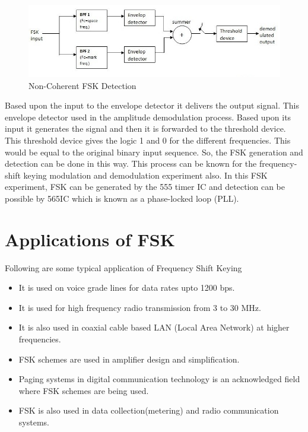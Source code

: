 \documentclass{report}
\begin{document}
	\newpage
	
		\begin{figure}[H]
		\centering
		\includegraphics[width=\linewidth]{images/non_coherent_fsk.jpg}
		\caption{Non-Coherent FSK Detection}
		\label{fig:}
	\end{figure}
	
	Based upon the input to the envelope detector it delivers the output signal. This envelope detector used in the amplitude demodulation process. Based upon its input it generates the signal and then it is forwarded to the threshold device. This threshold device gives the logic 1 and 0 for the different frequencies. This would be equal to the original binary input sequence. So, the FSK generation and detection can be done in this way. This process can be known for the frequency-shift keying modulation and demodulation experiment also. In this FSK experiment, FSK can be generated by the 555 timer IC and detection can be possible by 565IC which is known as a phase-locked loop (PLL).


	\section{Applications of FSK}
	\bigskip
	Following are some typical application of Frequency Shift Keying
	\begin{itemize}
		\item It is used on voice grade lines for data rates upto 1200 bps.
		\item It is used for high frequency radio transmission from 3 to 30 MHz.
		\item It is also used in coaxial cable based LAN (Local Area Network) at higher frequencies.
		\item FSK schemes are used in amplifier design and simplification.
		\item Paging systems in digital communication technology is an acknowledged field where FSK schemes are being used.
		\item FSK is also used in data collection(metering) and radio communication systems.
	\end{itemize}
\end{document}

